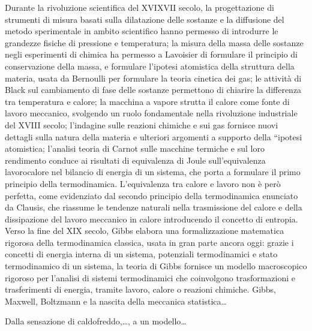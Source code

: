 \documentclass[letterpaper,10pt,italian]{jupyterBook}
\begin{document}
\sphinxAtStartPar
{}
Durante la rivoluzione scientifica del XVI\sphinxhyphen{}XVII secolo, la progettazione di strumenti di misura basati sulla dilatazione delle sostanze e la diffusione del metodo sperimentale in ambito scientifico hanno permesso di introdurre le grandezze fisiche di pressione e temperatura; la misura della massa delle sostanze negli esperimenti di chimica ha permesso a Lavoisier di formulare il principio di conservazione della massa, e formulare l’ipotesi atomistica della struttura della materia, usata da Bernoulli per formulare la teoria cinetica dei gas; le attività di Black sul cambiamento di fase delle sostanze permettono di chiarire la differenza tra temperatura e calore; la macchina a vapore strutta il calore come fonte di lavoro meccanico, svolgendo un ruolo fondamentale nella rivoluzione industriale del XVIII secolo; l’indagine sulle reazioni chimiche e sui gas fornisce nuovi dettagli sulla natura della materia e ulteriori argomenti a supporto della “ipotesi atomistica; l’analisi teoria di Carnot sulle macchine termiche e sul loro rendimento conduce ai risultati di equivalenza di Joule sull’equivalenza lavoro\sphinxhyphen{}calore nel bilancio di energia di un sistema, che porta a formulare il primo principio della termodinamica. L’equivalenza tra calore e lavoro non è però perfetta, come evidenziato dal secondo principio della termodinamica enunciato da Clausis, che riassume le tendenze naturali nella trasmissione del calore e della dissipazione del lavoro meccanico in calore introducendo il concetto di entropia. Verso la fine del XIX secolo, Gibbs elabora una formalizzazione matematica rigorosa della termodinamica classica, usata in gran parte ancora oggi: grazie i concetti di energia interna di un sistema, potenziali termodinamici e stato termodinamico di un sistema, la teoria di Gibbs fornisce un modello macroscopico rigoroso per l’analisi di sistemi termodinamici che coinvolgono trasformazioni e trasferimenti di energia, tramite lavoro, calore o reazioni chimiche.
Gibbs, Maxwell, Boltzmann e la nascita della meccanica statistica…

\sphinxAtStartPar
{}
Dalla sensazione di caldo\sphinxhyphen{}freddo,…, a un modello…
\end{document}
